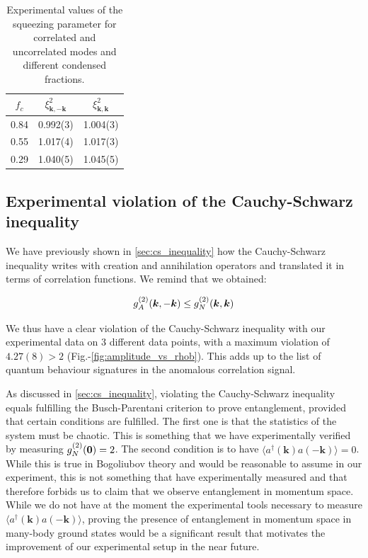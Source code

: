 \begin{table}[]
    \centering
    \begin{tabular}{|c|c|c|}
        \hline
        $f_c$ & $\xi^2_{\bm{k},-\bm{k}}$ & $\xi^2_{\bm{k},\bm{k}}$ \\
        \hline
        0.84 & 0.992(3) & 1.004(3) \\
        \hline
        0.55 & 1.017(4) & 1.017(3) \\
        \hline
        0.29 & 1.040(5) & 1.045(5) \\
        \hline
    \end{tabular}
    \caption{Experimental values of the squeezing parameter for correlated and uncorrelated modes and different condensed fractions.}
    \label{tab:squeezing}
\end{table}

\subsection{Experimental violation of the Cauchy-Schwarz inequality}

We have previously shown in \ref{sec:cs_inequality} how the Cauchy-Schwarz inequality writes with creation and annihilation operators and translated it in terms of correlation functions. We remind that we obtained:

\begin{equation}
    g^{(2)}_A (\bm{k},-\bm{k}) \leq g^{(2)}_N (\bm{k},\bm{k})
\end{equation}

We thus have a clear violation of the Cauchy-Schwarz inequality with our experimental data on 3 different data points, with a maximum violation of $4.27(8) > 2$ (Fig.-\ref{fig:amplitude_vs_rhob}). This adds up to the list of quantum behaviour signatures in the anomalous correlation signal.

As discussed in \ref{sec:cs_inequality}, violating the Cauchy-Schwarz inequality equals fulfilling the Busch-Parentani criterion to prove entanglement, provided that certain conditions are fulfilled. The first one is that the statistics of the system must be chaotic. This is something that we have experimentally verified by measuring $g^{(2)}_N (\bm{0}) = 2$. The second condition is to have $\langle a^{\dagger}({\bm k}) a({-\bm k}) \rangle=0$. While this is true in Bogoliubov theory and would be reasonable to assume in our experiment, this is not something that have experimentally measured and that therefore forbids us to claim that we observe entanglement in momentum space. While we do not have at the moment the experimental tools necessary to measure $\langle a^{\dagger}({\bm k}) a({-\bm k}) \rangle$, proving the presence of entanglement in momentum space in many-body ground states would be a significant result that motivates the improvement of our experimental setup in the near future.




